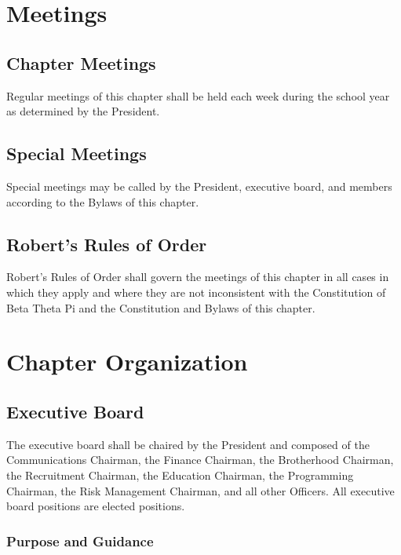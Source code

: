 \chapter{Meetings}
\label{cha:meetings}

\section{Chapter Meetings}
\label{sec:chapter-meetings}

Regular meetings of this chapter shall be held each week during the school year
as determined by the President.

\section{Special Meetings}
\label{sec:special-meetings}

Special meetings may be called by the President, executive board, and members
according to the Bylaws of this chapter.

\section{Robert's Rules of Order}
\label{sec:roberts-rules-of-order}

Robert's Rules of Order shall govern the meetings of this chapter in all cases
in which they apply and where they are not inconsistent with the Constitution of
Beta Theta Pi and the Constitution and Bylaws of this chapter.

\chapter{Chapter Organization}
\label{cha:chapter-organization}

\section{Executive Board}
\label{sec:executive-board}

The executive board shall be chaired by the President and composed of the
Communications Chairman, the Finance Chairman, the Brotherhood Chairman, the
Recruitment Chairman, the Education Chairman, the Programming Chairman, the Risk
Management Chairman, and all other Officers.
All executive board positions are elected positions.

\subsection{Purpose and Guidance}
\label{sec:purpose-and-guidelines}

